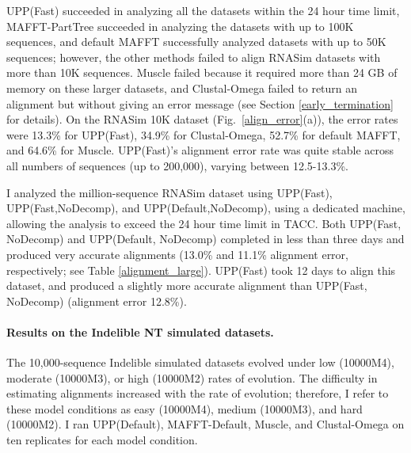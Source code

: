 UPP(Fast) succeeded in analyzing all the 
datasets within the 24 hour time limit, MAFFT-PartTree succeeded in analyzing the
datasets with up to 100K sequences, and default MAFFT successfully analyzed datasets with up to 50K sequences; however,
the other methods failed to align RNASim datasets with more than
10K sequences.
Muscle failed because it
required more than 24 GB of memory on these larger datasets, 
and Clustal-Omega 
failed to return an alignment  but
without giving an error message (see Section \ref{early_termination}
for details). %
On the RNASim 10K dataset
(Fig.~\ref{align_error}(a)), the error rates were
13.3\% for UPP(Fast),  
34.9\% for Clustal-Omega, 52.7\% for default MAFFT,
and 64.6\% for Muscle. 
UPP(Fast)'s 
alignment error rate was quite stable across all
numbers of sequences (up to 200,000), varying between 12.5-13.3\%.


I analyzed the million-sequence
RNASim dataset using UPP(Fast), UPP(Fast,NoDecomp),
and UPP(Default,NoDecomp),  
using  a dedicated machine, allowing the analysis to
exceed the 24 hour time limit in TACC.  
Both UPP(Fast, NoDecomp) and UPP(Default, NoDecomp) completed in less than three days 
and produced very accurate alignments %
(13.0\% and 11.1\% alignment error, respectively; see
Table \ref{alignment_large}).  
UPP(Fast) took 12 days to
align this dataset, and  produced a slightly more accurate alignment than UPP(Fast, NoDecomp) (alignment error 12.8\%).

\paragraph{Results on the Indelible NT simulated datasets. }
The 10,000-sequence Indelible simulated datasets evolved under 
low (10000M4), moderate (10000M3), or high 
(10000M2) 
rates of evolution. 
The difficulty in estimating alignments increased with the
rate of evolution; therefore,
I refer to these model conditions
as easy (10000M4), medium (10000M3), and hard (10000M2).
I ran UPP(Default), 
MAFFT-Default,
Muscle, and Clustal-Omega on ten replicates
for each model condition. 

